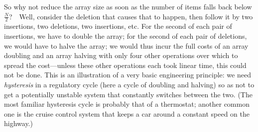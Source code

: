 \documentclass[11pt]{article}
\begin{document}
So why not reduce the array size as soon as the number of items falls back
below $\frac{N}{2}$?\ \ Well, consider the deletion that causes that to happen,
then follow it by two insertions, two deletions, two insertions, etc.  For the
second of each pair of insertions, we have to double the array; for the second
of each pair of deletions, we would have to halve the array; we would thus
incur the full costs of an array doubling and an array halving with only four
other operations over which to spread the cost---unless these other operations
each took linear time, this could not be done.  This is an illustration of
a very basic engineering principle: we need \emph{hysteresis} in a regulatory
cycle (here a cycle of doubling and halving) so as not to get a potentially
unstable system that constantly switches between the two.  (The most familiar
hysteresis cycle is probably that of a thermostat; another common one is
the cruise control system that keeps a car around a constant speed on the
highway.)
\end{document}
